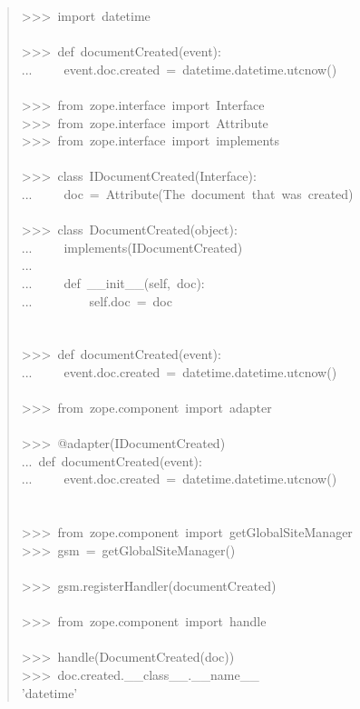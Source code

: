 \documentclass[a4paper,openany,twoside,final]{book}
\begin{document}
\begin{quote}{\ttfamily \raggedright \noindent
>{}>{}>~import~datetime\\
~\\
>{}>{}>~def~documentCreated(event):\\
...~~~~~event.doc.created~=~datetime.datetime.utcnow()\\
~\\
>{}>{}>~from~zope.interface~import~Interface\\
>{}>{}>~from~zope.interface~import~Attribute\\
>{}>{}>~from~zope.interface~import~implements\\
~\\
>{}>{}>~class~IDocumentCreated(Interface):\\
...~~~~~doc~=~Attribute(\textquotedbl{}The~document~that~was~created\textquotedbl{})\\
~\\
>{}>{}>~class~DocumentCreated(object):\\
...~~~~~implements(IDocumentCreated)\\
...\\
...~~~~~def~\_\_init\_\_(self,~doc):\\
...~~~~~~~~~self.doc~=~doc\\
~\\
~\\
>{}>{}>~def~documentCreated(event):\\
...~~~~~event.doc.created~=~datetime.datetime.utcnow()\\
~\\
>{}>{}>~from~zope.component~import~adapter\\
~\\
>{}>{}>~@adapter(IDocumentCreated)\\
...~def~documentCreated(event):\\
...~~~~~event.doc.created~=~datetime.datetime.utcnow()\\
~\\
~\\
>{}>{}>~from~zope.component~import~getGlobalSiteManager\\
>{}>{}>~gsm~=~getGlobalSiteManager()\\
~\\
>{}>{}>~gsm.registerHandler(documentCreated)\\
~\\
>{}>{}>~from~zope.component~import~handle\\
~\\
>{}>{}>~handle(DocumentCreated(doc))\\
>{}>{}>~doc.created.\_\_class\_\_.\_\_name\_\_\\
'datetime'
}
\end{quote}
\end{document}
